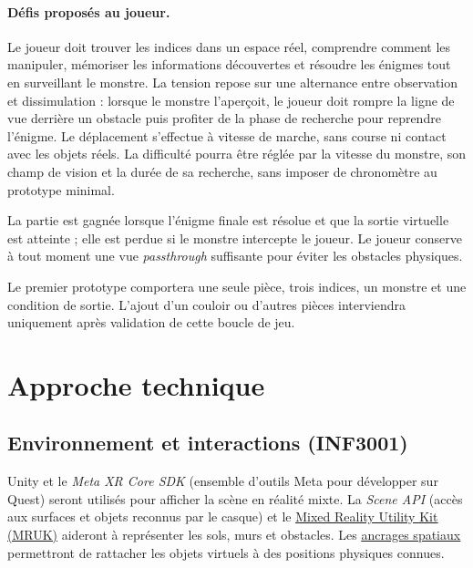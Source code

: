 \documentclass[11pt,a4paper]{article}
\newcommand{\doclink}[2]{\href{#1}{\textcolor{linkBlue}{\underline{#2}}}}
\begin{document}
\paragraph{Défis proposés au joueur.} Le joueur doit trouver les indices dans un espace réel, comprendre comment les manipuler, mémoriser les informations découvertes et résoudre les énigmes tout en surveillant le monstre. La tension repose sur une alternance entre observation et dissimulation : lorsque le monstre l'aperçoit, le joueur doit rompre la ligne de vue derrière un obstacle puis profiter de la phase de recherche pour reprendre l'énigme. Le déplacement s'effectue à vitesse de marche, sans course ni contact avec les objets réels. La difficulté pourra être réglée par la vitesse du monstre, son champ de vision et la durée de sa recherche, sans imposer de chronomètre au prototype minimal.

La partie est gagnée lorsque l'énigme finale est résolue et que la sortie virtuelle est atteinte ; elle est perdue si le monstre intercepte le joueur. Le joueur conserve à tout moment une vue \emph{passthrough} suffisante pour éviter les obstacles physiques.

Le premier prototype comportera une seule pièce, trois indices, un monstre et une condition de sortie. L'ajout d'un couloir ou d'autres pièces interviendra uniquement après validation de cette boucle de jeu.

\section{Approche technique}

\subsection{Environnement et interactions (INF3001)}

Unity et le \emph{Meta XR Core SDK} (ensemble d'outils Meta pour développer sur Quest) seront utilisés pour afficher la scène en réalité mixte. La \emph{Scene API} (accès aux surfaces et objets reconnus par le casque) et le \doclink{https://developers.meta.com/vr/documentation/unity/unity-mr-utility-kit-samples/}{Mixed Reality Utility Kit (MRUK)} aideront à représenter les sols, murs et obstacles. Les \doclink{https://developers.meta.com/vr/documentation/unity/unity-spatial-anchors-persist-content/}{ancrages spatiaux} permettront de rattacher les objets virtuels à des positions physiques connues.
\end{document}
